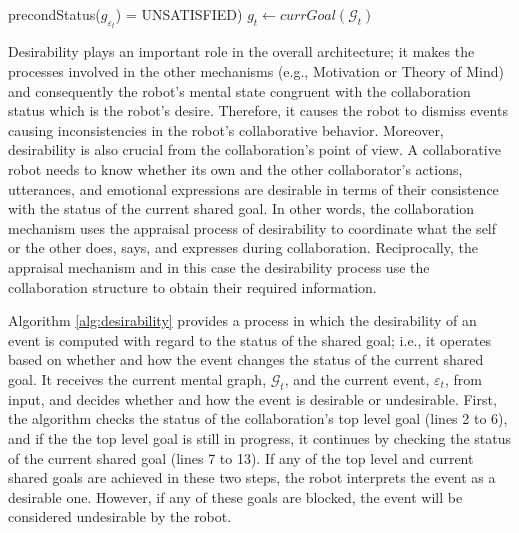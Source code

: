 \documentclass[letterpaper]{article}
\begin{document}
\begin{algorithm}
\begin{algorithmic}[1]
{{{					precondStatus($\mathit{g}_{\varepsilon_t}$)}} =
					{\fontsize{7}{8}\selectfont UNSATISFIED})} 
						\State {}
						\Statex
						\State $\mathit{g}_{t} \gets \textit{currGoal}{(\mathcal{G}_{t})}$
						\Statex
							\State {}
							\State {}
						\EndIf
					\EndIf
				\EndIf
			\EndIf
		\EndFunction
	\end{algorithmic}
\end{algorithm}

Desirability plays an important role in the overall architecture; it makes the
processes involved in the other mechanisms (e.g., Motivation or Theory of Mind)
and consequently the robot's mental state congruent with the collaboration
status which is the robot's desire. Therefore, it causes the robot to dismiss
events causing inconsistencies in the robot's collaborative behavior. Moreover,
desirability is also crucial from the collaboration's point of view. A
collaborative robot needs to know whether its own and the other collaborator's
actions, utterances, and emotional expressions are desirable in terms of their
consistence with the status of the current shared goal. In other words, the
collaboration mechanism uses the appraisal process of desirability to coordinate
what the self or the other does, says, and expresses during collaboration.
Reciprocally, the appraisal mechanism and in this case the desirability process
use the collaboration structure to obtain their required information.

Algorithm \ref{alg:desirability} provides a process in which the desirability of
an event is computed with regard to the status of the shared goal; i.e., it
operates based on whether and how the event changes the status of the current
shared goal. It receives the current mental graph, $\mathcal{G}_{t}$, and the
current event, $\varepsilon_t$, from input, and decides whether and how the
event is desirable or undesirable. First, the algorithm checks the status of the
collaboration's top level goal (lines 2 to 6), and if the the top level goal is
still in progress, it continues by checking the status of the current shared
goal (lines 7 to 13). If any of the top level and current shared goals are
achieved in these two steps, the robot interprets the event as a desirable one.
However, if any of these goals are blocked, the event will be considered
undesirable by the robot. 
\end{document}
